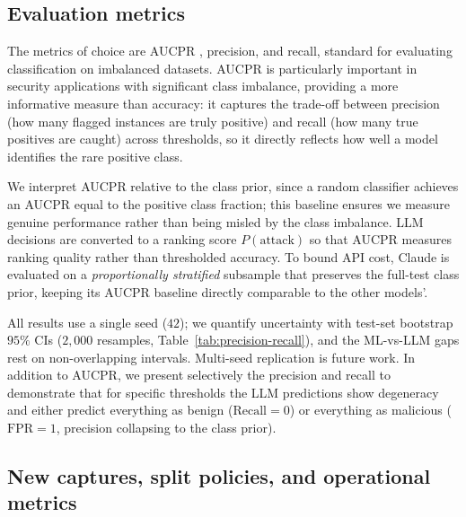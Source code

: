 \documentclass{jmlr}
\begin{document}
\subsection{Evaluation metrics}
\label{sec:evaluation-metrics}

The metrics of choice are AUCPR \citep{davis2006relationship}, precision, and recall, standard for evaluating classification on imbalanced datasets. AUCPR is particularly important in security applications with significant class imbalance, providing a more informative measure than accuracy: it captures the trade-off between precision (how many flagged instances are truly positive) and recall (how many true positives are caught) across thresholds, so it directly reflects how well a model identifies the rare positive class. 

We interpret AUCPR relative to the class prior, since a random classifier achieves an AUCPR equal to the positive class fraction; this baseline ensures we measure genuine performance rather than being misled by the class imbalance. LLM decisions are converted to a ranking score $P(\mathrm{attack})$ so that AUCPR measures ranking quality rather than thresholded accuracy. To bound API cost, Claude is evaluated on a \emph{proportionally stratified} subsample that preserves the full-test class prior, keeping its AUCPR baseline directly comparable to the other models'.

All results use a single seed ($42$); we quantify uncertainty with test-set bootstrap $95\%$ CIs ($2{,}000$ resamples, Table~\ref{tab:precision-recall}), and the ML-vs-LLM gaps rest on non-overlapping intervals. Multi-seed replication is future work. In addition to AUCPR, we present selectively the precision and recall to demonstrate that for specific thresholds the LLM predictions show degeneracy and either predict everything as benign ($\mathrm{Recall} = 0$) or everything as malicious ($\mathrm{FPR} = 1$, precision collapsing to the class prior).

\subsection{New captures, split policies, and operational metrics}
\label{sec:extension-methodology}
\end{document}
